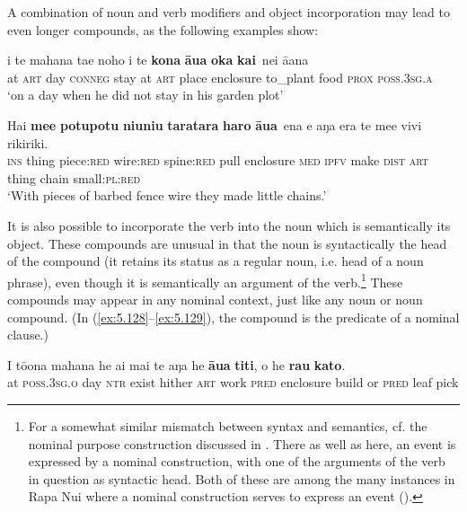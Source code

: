 A combination of noun and verb modifiers and object incorporation may lead to even longer compounds, as the following examples show:

\ea\label{ex:5.126}
\gll {\ꞌ}i te mahana ta{\ꞌ}e noho {\ꞌ}i te \textbf{kona} \textbf{{\ꞌ}āua} {\ob}\textbf{{\ꞌ}oka} \textbf{kai}\,{\cb} nei {\ꞌ}ā{\ꞌ}ana \\
at \textsc{art} day \textsc{conneg} stay at \textsc{art} place enclosure {\db}to\_plant food \textsc{prox} \textsc{poss.3sg.a} \\

\glt 
‘on a day when he did not stay in his garden plot’ \textstyleExampleref{[R381.004]} 
\z

\ea\label{ex:5.127}
\gll Hai \textbf{me{\ꞌ}e} \textbf{potupotu} \textbf{niuniu} \textbf{taratara} {\ob}\textbf{haro} \textbf{{\ꞌ}āua}\,{\cb} ena e aŋa era  te me{\ꞌ}e vivi rikiriki.\\
\textsc{ins} thing piece:\textsc{red} wire:\textsc{red} spine:\textsc{red} {\db}pull enclosure \textsc{med} \textsc{ipfv} make \textsc{dist}  \textsc{art} thing chain small:\textsc{pl}:\textsc{red}\\

\glt 
‘With pieces of barbed fence wire they made little chains.’ \textstyleExampleref{[R364.005]} 
\z

It is also possible to incorporate the verb into the noun which is semantically its object. These compounds are unusual in that the noun is syntactically the head of the compound (it retains its status as a regular noun, i.e. head of a noun phrase), even though it is semantically an argument of the verb.\footnote{\label{fn:272}For a somewhat similar mismatch between syntax and semantics, cf. the nominal purpose construction discussed in . There as well as here, an event is expressed by a nominal construction, with one of the arguments of the verb in question as syntactic head.
Both of these are among the many instances in Rapa Nui where a nominal construction serves to express an event ().} These compounds may appear in any nominal context, just like any noun or noun compound. (In (\ref{ex:5.128}–\ref{ex:5.129}), the compound is the predicate of a nominal clause.)

\ea\label{ex:5.128}
\gll {\ꞌ}I tō{\ꞌ}ona mahana he ai mai te aŋa he \textbf{{\ꞌ}āua} \textbf{titi},  {\ꞌ}o he \textbf{rau} \textbf{kato}.\\
at \textsc{poss.3sg.o} day \textsc{ntr} exist hither \textsc{art} work \textsc{pred} enclosure build  or \textsc{pred} leaf pick\\

